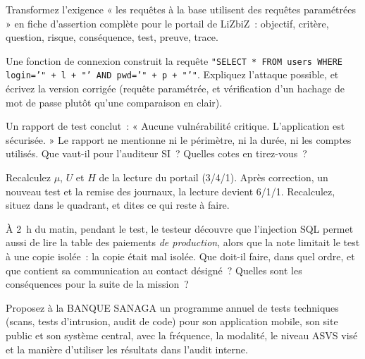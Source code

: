 \begin{boxexo}[title={\ding{45}\quad Exercice~22.5. Une exigence ASVS \niveaumoyen}]
Transformez l'exigence « les requêtes à la base utilisent des requêtes
paramétrées » en fiche d'assertion complète pour le portail de LiZbiZ~:
objectif, critère, question, risque, conséquence, test, preuve, trace.
\end{boxexo}

\begin{boxexo}[title={\ding{45}\quad Exercice~22.6. Corriger le code \niveaumoyen}]
Une fonction de connexion construit la requête
\texttt{"SELECT * FROM users WHERE login='" + l + "' AND pwd='" + p + "'"}.
Expliquez l'attaque possible, et écrivez la version corrigée (requête
paramétrée, et vérification d'un hachage de mot de passe plutôt qu'une
comparaison en clair).
\end{boxexo}

\begin{boxexo}[title={\ding{45}\quad Exercice~22.7. Lire un rapport \niveaumoyen}]
Un rapport de test conclut~: « Aucune vulnérabilité critique. L'application
est sécurisée. » Le rapport ne mentionne ni le périmètre, ni la durée, ni
les comptes utilisés. Que vaut-il pour l'auditeur SI~? Quelles cotes en
tirez-vous~?
\end{boxexo}

\begin{boxexo}[title={\ding{45}\quad Exercice~22.8. Recalculer la lecture \niveaumoyen}]
Recalculez $\mu$, $U$ et $H$ de la lecture du portail (3/4/1). Après
correction, un nouveau test et la remise des journaux, la lecture devient
6/1/1. Recalculez, situez dans le quadrant, et dites ce qui reste à faire.
\end{boxexo}

\begin{boxexo}[title={\ding{45}\quad Exercice~22.9. La faille trouvée la nuit \niveauexpert}]
À 2~h du matin, pendant le test, le testeur découvre que l'injection SQL
permet aussi de lire la table des paiements \emph{de production}, alors
que la note limitait le test à une copie isolée~: la copie était mal
isolée. Que doit-il faire, dans quel ordre, et que contient sa
communication au contact désigné~? Quelles sont les conséquences pour la
suite de la mission~?
\end{boxexo}

\begin{boxexo}[title={\ding{45}\quad Exercice~22.10. Un programme de tests \niveauexpert}]
Proposez à la BANQUE SANAGA un programme annuel de tests techniques
(scans, tests d'intrusion, audit de code) pour son application mobile, son
site public et son système central, avec la fréquence, la modalité, le
niveau ASVS visé et la manière d'utiliser les résultats dans l'audit
interne.
\end{boxexo}

